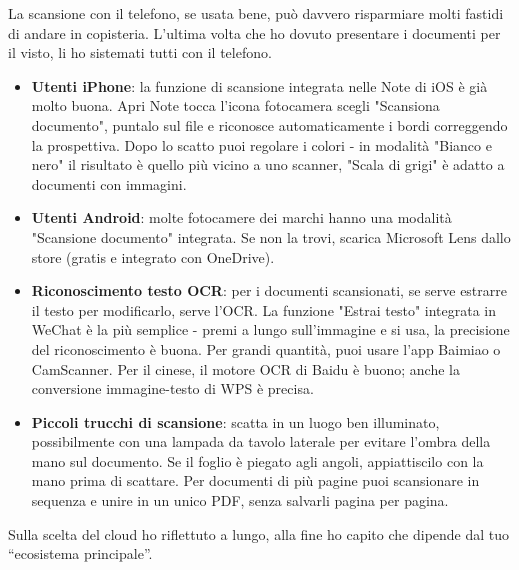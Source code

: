 
La scansione con il telefono, se usata bene, può davvero risparmiare molti fastidi di andare in copisteria. L'ultima volta che ho dovuto presentare i documenti per il visto, li ho sistemati tutti con il telefono.

\begin{itemize}
  \item \textbf{Utenti iPhone}: la funzione di scansione integrata nelle Note di iOS è già molto buona. Apri Note tocca l'icona fotocamera scegli "Scansiona documento", puntalo sul file e riconosce automaticamente i bordi correggendo la prospettiva. Dopo lo scatto puoi regolare i colori - in modalità "Bianco e nero" il risultato è quello più vicino a uno scanner, "Scala di grigi" è adatto a documenti con immagini.
  \item \textbf{Utenti Android}: molte fotocamere dei marchi hanno una modalità "Scansione documento" integrata. Se non la trovi, scarica Microsoft Lens dallo store (gratis e integrato con OneDrive).
  \item \textbf{Riconoscimento testo OCR}: per i documenti scansionati, se serve estrarre il testo per modificarlo, serve l'OCR. La funzione "Estrai testo" integrata in WeChat è la più semplice - premi a lungo sull'immagine e si usa, la precisione del riconoscimento è buona. Per grandi quantità, puoi usare l'app Baimiao o CamScanner. Per il cinese, il motore OCR di Baidu è buono; anche la conversione immagine-testo di WPS è precisa.
  \item \textbf{Piccoli trucchi di scansione}: scatta in un luogo ben illuminato, possibilmente con una lampada da tavolo laterale per evitare l'ombra della mano sul documento. Se il foglio è piegato agli angoli, appiattiscilo con la mano prima di scattare. Per documenti di più pagine puoi scansionare in sequenza e unire in un unico PDF, senza salvarli pagina per pagina.
\end{itemize}


Sulla scelta del cloud ho riflettuto a lungo, alla fine ho capito che dipende dal tuo “ecosistema principale”.

